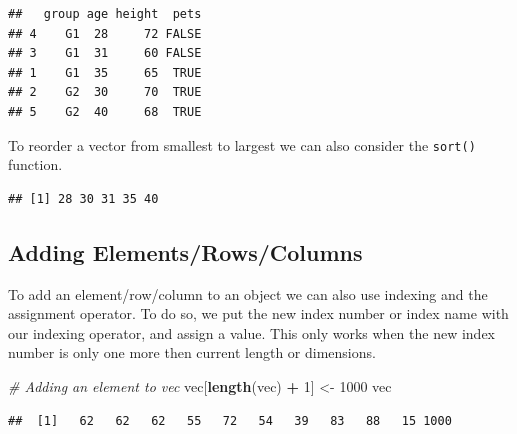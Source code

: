 \documentclass[
]{book}
\newenvironment{Shaded}{\begin{snugshade}}{\end{snugshade}}
\newcommand{\CommentTok}[1]{\textcolor[rgb]{0.56,0.35,0.01}{\textit{#1}}}
\newcommand{\DecValTok}[1]{\textcolor[rgb]{0.00,0.00,0.81}{#1}}
\newcommand{\KeywordTok}[1]{\textcolor[rgb]{0.13,0.29,0.53}{\textbf{#1}}}
\newcommand{\NormalTok}[1]{#1}
\newcommand{\OperatorTok}[1]{\textcolor[rgb]{0.81,0.36,0.00}{\textbf{#1}}}
\newcommand{\StringTok}[1]{\textcolor[rgb]{0.31,0.60,0.02}{#1}}
\begin{document}
\begin{Shaded}
\end{Shaded}

\begin{verbatim}
##   group age height  pets
## 4    G1  28     72 FALSE
## 3    G1  31     60 FALSE
## 1    G1  35     65  TRUE
## 2    G2  30     70  TRUE
## 5    G2  40     68  TRUE
\end{verbatim}

To reorder a vector from smallest to largest we can also consider the \texttt{sort()} function.

\begin{Shaded}
\end{Shaded}

\begin{verbatim}
## [1] 28 30 31 35 40
\end{verbatim}

\hypertarget{adding-elementsrowscolumns}{%
\subsection{Adding Elements/Rows/Columns}\label{adding-elementsrowscolumns}}

To add an element/row/column to an object we can also use indexing and the assignment operator. To do so, we put the new index number or index name with our indexing operator, and assign a value. This only works when the new index number is only one more then current length or dimensions.

\begin{Shaded}
\begin{Highlighting}[]
\CommentTok{# Adding an element to vec}
\NormalTok{vec[}\KeywordTok{length}\NormalTok{(vec) }\OperatorTok{+}\StringTok{ }\DecValTok{1}\NormalTok{] <-}\StringTok{ }\DecValTok{1000}
\NormalTok{vec}
\end{Highlighting}
\end{Shaded}

\begin{verbatim}
##  [1]   62   62   62   55   72   54   39   83   88   15 1000
\end{verbatim}
\end{document}
